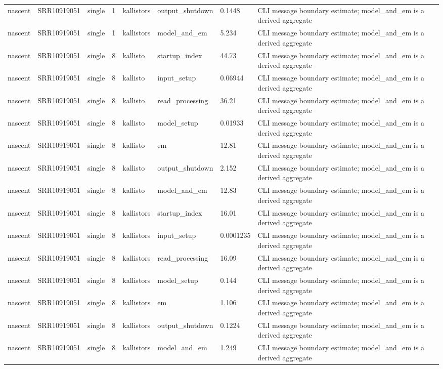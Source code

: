 \begin{tabular}{llllllll}
nascent & SRR10919051 & single & 1 & kallistors & output\_shutdown & 0.1448 & CLI message boundary estimate; model\_and\_em is a derived aggregate \\
nascent & SRR10919051 & single & 1 & kallistors & model\_and\_em & 5.234 & CLI message boundary estimate; model\_and\_em is a derived aggregate \\
nascent & SRR10919051 & single & 8 & kallisto & startup\_index & 44.73 & CLI message boundary estimate; model\_and\_em is a derived aggregate \\
nascent & SRR10919051 & single & 8 & kallisto & input\_setup & 0.06944 & CLI message boundary estimate; model\_and\_em is a derived aggregate \\
nascent & SRR10919051 & single & 8 & kallisto & read\_processing & 36.21 & CLI message boundary estimate; model\_and\_em is a derived aggregate \\
nascent & SRR10919051 & single & 8 & kallisto & model\_setup & 0.01933 & CLI message boundary estimate; model\_and\_em is a derived aggregate \\
nascent & SRR10919051 & single & 8 & kallisto & em & 12.81 & CLI message boundary estimate; model\_and\_em is a derived aggregate \\
nascent & SRR10919051 & single & 8 & kallisto & output\_shutdown & 2.152 & CLI message boundary estimate; model\_and\_em is a derived aggregate \\
nascent & SRR10919051 & single & 8 & kallisto & model\_and\_em & 12.83 & CLI message boundary estimate; model\_and\_em is a derived aggregate \\
nascent & SRR10919051 & single & 8 & kallistors & startup\_index & 16.01 & CLI message boundary estimate; model\_and\_em is a derived aggregate \\
nascent & SRR10919051 & single & 8 & kallistors & input\_setup & 0.0001235 & CLI message boundary estimate; model\_and\_em is a derived aggregate \\
nascent & SRR10919051 & single & 8 & kallistors & read\_processing & 16.09 & CLI message boundary estimate; model\_and\_em is a derived aggregate \\
nascent & SRR10919051 & single & 8 & kallistors & model\_setup & 0.144 & CLI message boundary estimate; model\_and\_em is a derived aggregate \\
nascent & SRR10919051 & single & 8 & kallistors & em & 1.106 & CLI message boundary estimate; model\_and\_em is a derived aggregate \\
nascent & SRR10919051 & single & 8 & kallistors & output\_shutdown & 0.1224 & CLI message boundary estimate; model\_and\_em is a derived aggregate \\
nascent & SRR10919051 & single & 8 & kallistors & model\_and\_em & 1.249 & CLI message boundary estimate; model\_and\_em is a derived aggregate \\
\bottomrule
\end{tabular}
